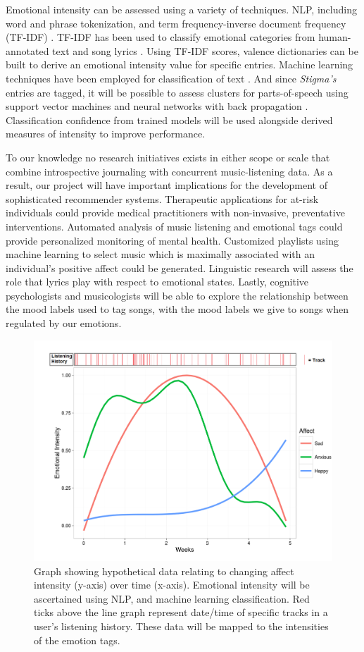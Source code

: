 \documentclass[a4paper]{article}
\begin{document}
Emotional intensity can be assessed using a variety of techniques. NLP, including word and phrase tokenization, and term frequency-inverse document frequency (TF-IDF) \cite{danisman2008feeler}. TF-IDF has been used to classify emotional categories from human-annotated text and song lyrics \cite{ van2010automatic}.  Using TF-IDF scores, valence dictionaries can be built to derive an emotional intensity value for specific entries. Machine learning techniques have been employed for classification of text \cite{manning1999foundations}. And since \textit{Stigma's} entries are tagged, it will be possible to assess clusters for parts-of-speech using support vector machines \cite{joachims2002learning} and neural networks with back propagation \cite{collobert2008unified}. Classification confidence from trained models will be used alongside derived measures of intensity to improve performance. 

To our knowledge no research initiatives exists in either scope or scale that combine introspective journaling with concurrent music-listening data. As a result, our project will have important implications for the development of sophisticated recommender systems. Therapeutic applications for at-risk individuals could provide medical practitioners with non-invasive, preventative interventions. Automated analysis of music listening and emotional tags could provide personalized monitoring of mental health. Customized playlists using machine learning to select music which is maximally associated with an individual's positive affect could be generated. Linguistic research will assess the role that lyrics play with respect to emotional states. Lastly, cognitive psychologists and musicologists will be able to explore the relationship between the mood labels used to tag songs, with the mood labels we give to songs when regulated by our emotions.

\begin{figure}[ht!]
\centering
\includegraphics[width=0.8\linewidth]{GRA_mental.png}
\caption[Mental Health and Music]{Graph showing hypothetical data relating to changing affect intensity (y-axis) over time (x-axis). Emotional intensity will be ascertained using NLP, and machine learning classification. Red ticks above the line graph represent date/time of specific tracks in a user's listening history. These data will be mapped to the intensities of the emotion tags.}
\end{figure}
\end{document}

